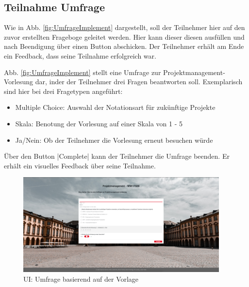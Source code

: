 \subsection{Teilnahme Umfrage}
\label{ssec:UmfrageImplement}

Wie in Abb. \vref{fig:UmfrageImplement} dargestellt, soll der Teilnehmer hier auf den zuvor erstellten Frageboge geleitet werden. 
Hier kann dieser diesen ausfüllen und nach Beendigung über einen Button abschicken. 
Der Teilnehmer erhält am Ende ein Feedback, dass seine Teilnahme erfolgreich war.

Abb. \vref{fig:UmfrageImplement}  stellt eine Umfrage zur Projektmanagement-Vorlesung dar, inder der Teilnehmer drei Fragen beantworten soll. 
Exemplarisch sind hier bei drei Fragetypen angeführt: 
\begin{itemize}
	\item Multiple Choice: Auswahl der Notationsart für zukünftige Projekte
	\item Skala: Benotung der Vorlesung auf einer Skala von 1 - 5
	\item Ja/Nein: Ob der Teilnehmer die Vorlesung erneut besuchen würde 
\end{itemize}

Über den Button \jinline|Complete| kann der Teilnehmer die Umfrage beenden. 
Er erhält ein visuelles Feedback über seine Teilnahme.

\begin{figure}[hp]
	\centering
	\includegraphics[width=0.95\textwidth, keepaspectratio]{img/client/TeilnahmeUmfrage.png}
	\captionsetup{justification=centering, format=plain}
	\caption[\acf{UI}: Umfrage basierend auf der Vorlage]{\acf{UI}: Umfrage basierend auf der Vorlage \\ \quelleScreenshot}
	\label{fig:UmfrageImplement}
\end{figure}
